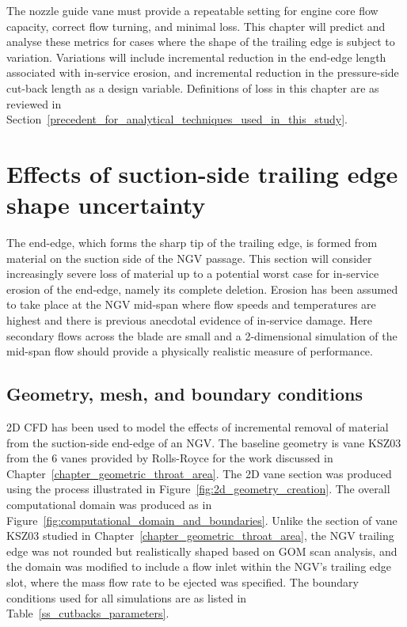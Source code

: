 \documentclass[a4paper, 11pt, oneside]{report}
\begin{document}
The nozzle guide vane must provide a repeatable setting for engine core flow capacity, correct flow turning, and minimal loss. This chapter will predict and analyse these metrics for cases where the shape of the trailing edge is subject to variation. Variations will include incremental reduction in the end-edge length associated with in-service erosion, and incremental reduction in the pressure-side cut-back length as a design variable. Definitions of loss in this chapter are as reviewed in Section~\ref{precedent_for_analytical_techniques_used_in_this_study}.



\section{Effects of suction-side trailing edge shape uncertainty}
\label{suction_side_cutbacks}

The end-edge, which forms the sharp tip of the trailing edge, is formed from material on the suction side of the NGV passage. This section will consider increasingly severe loss of material up to a potential worst case for in-service erosion of the end-edge, namely its complete deletion. Erosion has been assumed to take place at the NGV mid-span where flow speeds and temperatures are highest and there is previous anecdotal evidence of in-service damage. Here secondary flows across the blade are small and a 2-dimensional simulation of the mid-span flow should provide a physically realistic measure of performance.

\subsection{Geometry, mesh, and boundary conditions}

2D CFD has been used to model the effects of incremental removal of material from the suction-side end-edge of an NGV. The baseline geometry is vane KSZ03 from the 6 vanes provided by Rolls-Royce for the work discussed in Chapter~\ref{chapter_geometric_throat_area}. The 2D vane section was produced using the process illustrated in Figure~\ref{fig:2d_geometry_creation}. The overall computational domain was produced as in Figure~\ref{fig:computational_domain_and_boundaries}. Unlike the section of vane KSZ03 studied in Chapter~\ref{chapter_geometric_throat_area}, the NGV trailing edge was not rounded but realistically shaped based on GOM scan analysis, and the domain was modified to include a flow inlet within the NGV's trailing edge slot, where the mass flow rate to be ejected was specified. The boundary conditions used for all simulations are as listed in Table~\ref{ss_cutbacks_parameters}.
\end{document}
